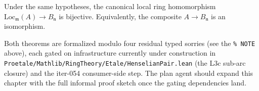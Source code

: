 \begin{theorem}
  \label{thm:etale-over-strictly-henselian-localization-isom-skeleton}
  Under the same hypotheses, the canonical local ring homomorphism
  $\mathrm{Loc}_{\mathfrak{m}}(A) \to B_{\mathfrak{n}}$ is bijective.
  Equivalently, the composite $A \to B_{\mathfrak{n}}$ is an
  isomorphism.
\end{theorem}

Both theorems are formalized modulo four residual typed sorries (see
the \texttt{\% NOTE} above), each gated on infrastructure currently
under construction in
\texttt{Proetale/Mathlib/RingTheory/Etale/HenselianPair.lean}
(the L3c sub-arc closure) and the iter-054 consumer-side
 step. The plan agent should expand this chapter
with the full informal proof sketch once the gating dependencies land.
